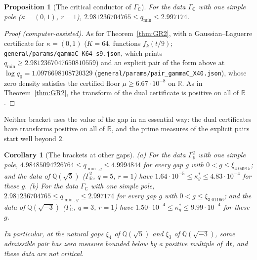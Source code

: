 \documentclass[11pt]{amsart}
\newcommand{\RR}{\mathbb R}
\newcommand{\QQ}{\mathbb Q}
\newcommand{\dd}{\,\mathrm d}
\newcommand{\xin}[1]{\xi_{#1}}
\newcommand{\GR}{\Gamma_{\mathbb R}}
\newcommand{\GC}{\Gamma_{\mathbb C}}
\newcommand{\kstar}{\kappa^{*}}
\newcommand{\qmin}{q_{\min}}
\newtheorem{proposition}[theorem]{Proposition}
\newtheorem{corollary}[theorem]{Corollary}
\theoremstyle{definition}
\theoremstyle{remark}
\numberwithin{equation}{section}
\begin{document}
\begin{proposition}[The critical conductor of $\GC$]\label{prop:GC}
For the data $\GC$ with one simple pole \textup{(}$\kappa=(0,1)$, $r=1$\textup{)}, $2.981236704765\le\qmin\le2.997174$.
\end{proposition}

\begin{proof}[Proof \textup{(computer-assisted)}]
As for Theorem~\ref{thm:GR2}, with a Gaussian--Laguerre certificate for $\kappa=(0,1)$ ($K=64$, functions $f_k(t/9)$;
\nolinkurl{general/params/gammaC_K64_s9.json}, which prints $\qmin\ge2.9812367047650810559$) and an explicit pair of the form above
at $\log q_0=1.0976698108720329$ (\nolinkurl{general/params/pair_gammaC_X40.json}), whose zero density satisfies the certified floor
$\mu\ge6.67\cdot10^{-8}$ on $\RR$. As in Theorem~\ref{thm:GR2}, the transform of the dual certificate is positive on all of $\RR$.
\end{proof}

Neither bracket uses the value of the gap in an essential way: the dual certificates have transforms positive on all of $\RR$,
and the prime measures of the explicit pairs start well beyond $2$.

\begin{corollary}[The brackets at other gaps]\label{cor:natural-gaps}
\textup{(a)} For the data $\GR^2$ with one simple pole, $4.98485094226764\le q_{\min,g}\le4.9994844$ for every gap $g$ with
$0<g\le\xin{4.04915}$; and the data of $\QQ(\sqrt5)$ \textup{(}$\GR^2$, $q=5$, $r=1$\textup{)} have $1.64\cdot10^{-5}\le\kstar_g\le4.83\cdot10^{-4}$
for these $g$.
\textup{(b)} For the data $\GC$ with one simple pole, $2.981236704765\le q_{\min,g}\le2.997174$ for every gap $g$ with
$0<g\le\xin{3.01166}$; and the data of $\QQ(\sqrt{-3})$ \textup{(}$\GC$, $q=3$, $r=1$\textup{)} have $1.50\cdot10^{-4}\le\kstar_g\le9.99\cdot10^{-4}$
for these $g$.

\noindent In particular, at the natural gaps $\xin4$ of $\QQ(\sqrt5)$ and $\xin3$ of $\QQ(\sqrt{-3})$, some admissible pair has zero measure
bounded below by a positive multiple of $\dd t$, and these data are not critical.
\end{corollary}
\end{document}
